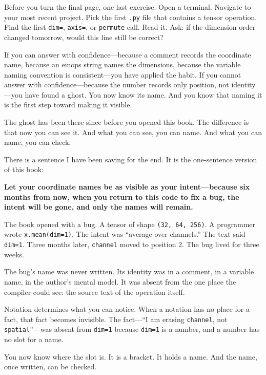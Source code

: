 \documentclass[11pt,titlepage]{article}
\begin{document}
Before you turn the final page, one last exercise. Open a terminal.
Navigate to your most recent project. Pick the first \texttt{.py} file
that contains a tensor operation. Find the first \texttt{dim=},
\texttt{axis=}, or \texttt{permute} call. Read it. Ask: if the dimension
order changed tomorrow, would this line still be correct?

If you can answer with confidence---because a comment records the
coordinate name, because an einops string names the dimensions, because
the variable naming convention is consistent---you have applied the
habit. If you cannot answer with confidence---because the number records
only position, not identity---you have found a ghost. You now know its
name. And you know that naming it is the first step toward making it
visible.

The ghost has been there since before you opened this book. The
difference is that now you can see it. And what you can see, you can
name. And what you can name, you can check.

\vspace{2em}

There is a sentence I have been saving for the end. It is the
one-sentence version of this book:

\textbf{Let your coordinate names be as visible as your intent---because
six months from now, when you return to this code to fix a bug, the
intent will be gone, and only the names will remain.}

\vspace{2em}

The book opened with a bug. A tensor of shape \texttt{(32,\ 64,\ 256)}.
A programmer wrote \texttt{x.mean(dim=1)}. The intent was ``average over
channels.'' The text said \texttt{dim=1}. Three months later,
\texttt{channel} moved to position 2. The bug lived for three weeks.

The bug's name was never written. Its identity was in a comment, in a
variable name, in the author's mental model. It was absent from the one
place the compiler could see: the source text of the operation itself.

Notation determines what you can notice. When a notation has no place
for a fact, that fact becomes invisible. The fact---``I am erasing
\texttt{channel}, not \texttt{spatial}''---was absent from
\texttt{dim=1} because \texttt{dim=1} is a number, and a number has no
slot for a name.

You now know where the slot is. It is a bracket. It holds a name. And
the name, once written, can be checked.
\end{document}
